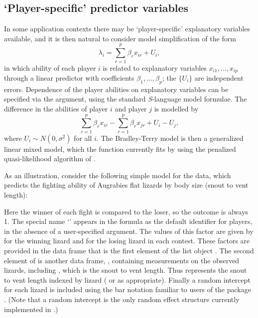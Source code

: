 \subsection{`Player-specific' predictor variables}

In some application contexts there may be `player-specific' explanatory
variables available, and it is then natural to consider model simplification of
the form
\begin{equation}
\lambda_i=\sum_{r=1}^p\beta_rx_{ir} + U_i,
\end{equation}
in which ability of each player $i$ is related to explanatory variables
$x_{i1},\ldots,x_{ip}$ through a linear predictor with coefficients
$\beta_1,\ldots,\beta_p$; the $\{U_i\}$ are independent errors.
Dependence of the player abilities on explanatory variables can be specified via the
 argument, using the standard \emph{S}-language
model formulae.  The difference in the abilities of player $i$
and player $j$ is modelled by
\begin{equation}
\sum_{r=1}^p\beta_rx_{ir} - \sum_{r=1}^p\beta_rx_{jr} + U_i - U_j,
\label{eq:structured}
\end{equation}
where $U_i \sim N(0, \sigma^2)$ for all $i$. The Bradley-Terry model is then a
generalized linear mixed model, which the  function currently
fits by using the penalized quasi-likelihood algorithm of \citet{bres:93}.

As an illustration, consider the following simple model for the
 data, which predicts the fighting ability of Augrabies flat
lizards by body size (snout to vent length):

\Rcodeplaceholder{}

Here the winner of each fight is compared to the loser, so the outcome is
always 1.  The special name `' appears in the formula as the default
identifier for players, in the absence of a user-specified  argument.
The values of this factor are given by  for the winning lizard
and  for the losing lizard in each contest. %
These factors are provided in the data frame  that is the
first element of the list object . The second element of
 is another data frame, , containing
measurements on the observed lizards, including , which is the snout
to vent length. Thus  represents the snout to vent length
indexed by lizard ( or  as appropriate).  Finally a
random intercept for each lizard is included using the bar notation familiar
to users of the  package \citep{bate:11}. (Note that a random intercept is the only random effect
structure currently implemented in .)

